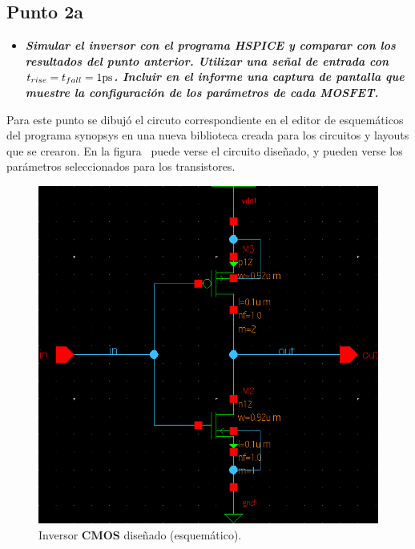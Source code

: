 
\subsection{Punto \textbf{2a}}

\begin{itemize}
\item \emph{\textbf{Simular el inversor con el programa HSPICE y comparar con los resultados del punto anterior. Utilizar una señal de entrada con $t_{rise} = t_{fall} = 1 \si[per-mode=symbol]{\pico\second}$. Incluir en el informe una captura de pantalla que muestre la configuración de los parámetros de cada MOSFET.}}
\end{itemize}

Para este punto se dibujó el circuto correspondiente en el editor de esquemáticos del programa synopsys en una nueva biblioteca creada para los circuitos y layouts que se crearon. En la figura~ puede verse el circuito diseñado, y pueden verse los parámetros seleccionados para los transistores.




\begin{figure}[H] %
\begin{center}
\includegraphics[width=0.85 \textwidth, angle=0]{./img/point2/TEST_LOGIC_GATES_Inverter_schematic}
\caption{\label{fig:fig_inverter_schematic}\footnotesize{Inversor \textbf{CMOS} diseñado (esquemático).}}
\end{center}
\end{figure}


